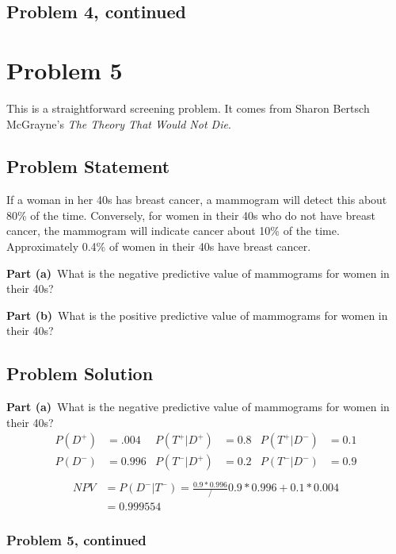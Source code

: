 \documentclass[12pt]{article}
\theoremstyle{definition}
\begin{document}
\newpage
\subsection*{Problem 4, continued}


\newpage
\section*{Problem 5}

This is a straightforward screening problem. It comes from Sharon Bertsch McGrayne's {\em The Theory That Would Not Die}.

\subsection*{Problem Statement}

If a woman in her 40s has breast cancer, a mammogram will detect this about 80\% of the time. Conversely, for women in their 40s who do not have breast cancer, the mammogram will indicate cancer about 10\% of the time. Approximately 0.4\% of women in their 40s have breast cancer.

\bigskip
\noindent
{\bf Part (a)}\ What is the negative predictive value of mammograms for women in their 40s?

\bigskip
\noindent
{\bf Part (b)}\ What is the positive predictive value of mammograms for women in their 40s?


\subsection*{Problem Solution}

{\bf Part (a)}\ What is the negative predictive value of mammograms for women in their 40s?
\begin{align*}
P(D^+) &= .004 &P(T^+|D^+) &= 0.8 &P(T^+|D^-) &= 0.1\\
P(D^-)&= 0.996 &P(T^-|D^+) &= 0.2 &P(T^-|D^-) &= 0.9\\
\end{align*}
\begin{align*}
NPV &= P(D^-|T^-) = \frac{0.9 * 0.996}/{0.9 * 0.996 + 0.1*0.004}\\
&= 0.999554
\end{align*}

\newpage
\subsubsection*{Problem 5, continued}
\end{document}
